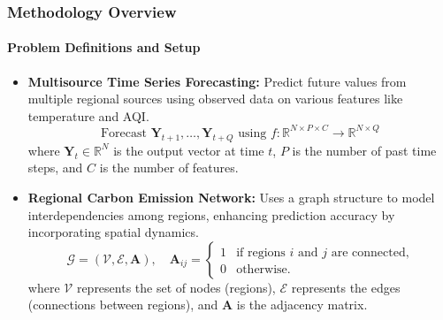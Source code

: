 \documentclass[light]{lutbeamer} %
\begin{document}
\begin{frame}
    \frametitle{Methodology Overview}
    \framesubtitle{Problem Definitions and Setup}
    \begin{itemize}
        \item \textbf{Multisource Time Series Forecasting:}
              Predict future values from multiple regional sources using observed data on various features like temperature and AQI.
              \[
                  \text{Forecast } \bm{Y}_{t+1}, \dots, \bm{Y}_{t+Q} \text{ using } f:\mathbb{R}^{N \times P \times C} \rightarrow \mathbb{R}^{N \times Q}
              \]
              where \( \bm{Y}_t \in \mathbb{R}^N \) is the output vector at time \( t \), \( P \) is the number of past time steps, and \( C \) is the number of features.

        \item \textbf{Regional Carbon Emission Network:}
              Uses a graph structure to model interdependencies among regions, enhancing prediction accuracy by incorporating spatial dynamics.
              \[
                  \mathcal{G} = (\mathcal{V}, \mathcal{E}, \bm{A}), \quad \bm{A}_{ij} =
                  \begin{cases}
                      1 & \text{if regions } i \text{ and } j \text{ are connected,} \\
                      0 & \text{otherwise.}
                  \end{cases}
              \]
              where \( \mathcal{V} \) represents the set of nodes (regions), \( \mathcal{E} \) represents the edges (connections between regions), and \( \bm{A} \) is the adjacency matrix.
    \end{itemize}
\end{frame}
\end{document}
